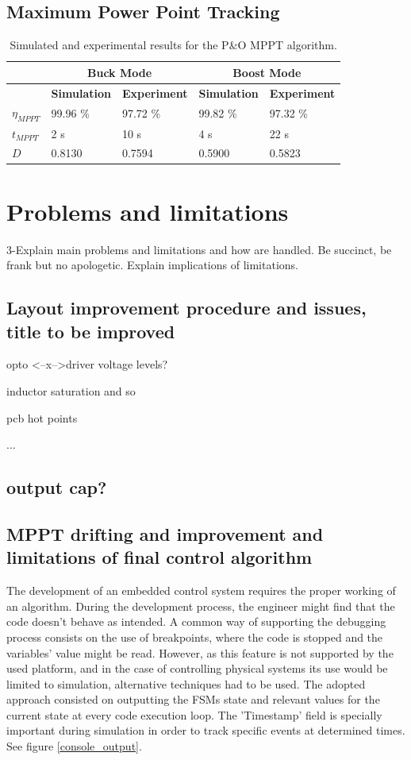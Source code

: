 \subsection{Maximum Power Point Tracking}

\begin{table}[H]
	\centering
	\begin{tabular}{|>{\centering}p{2.3cm}|p{2.3cm}|p{2.3cm}|p{2.3cm}|p{2.3cm}|}
		\hline
		 \rowcolor{lightgray} & \multicolumn{2}{|c|}{ \textbf{Buck Mode}} & \multicolumn{2}{|c|}{ \textbf{Boost Mode}} \tabularnewline \hline
		\rowcolor{lightgray} \textbf{} & \textbf{Simulation}  & \textbf{Experiment} & \textbf{Simulation}  & \textbf{Experiment}  \tabularnewline \hline
		$\eta_{MPPT}$ & 99.96 \% & 97.72 \% & 99.82 \% & 97.32 \% \tabularnewline \hline
		$t_{MPPT}$ & 2 s & 10 s & 4 s & 22 s \tabularnewline \hline
		$D$  & 0.8130 & 0.7594 & 0.5900 & 0.5823 \tabularnewline \hline
	\end{tabular}
	\caption{Simulated and experimental results for the P\&O MPPT algorithm.}
	\label{tab:comparisonMPPT}
\end{table}

\section{Problems and limitations}
3-Explain main problems and limitations and how are handled. Be succinct, be frank but no apologetic. Explain implications of limitations.
\subsection{Layout improvement procedure and issues, title to be improved}
opto <--x-->driver voltage levels?

inductor saturation and so

pcb hot points

...
\subsection{output cap?}
\subsection{MPPT drifting and improvement and limitations of final control algorithm}
The development of an embedded control system requires the proper working of an algorithm. During the development process, the engineer might find that the code doesn't behave as intended. A common way of supporting the debugging process consists on the use of breakpoints, where the code is stopped and the variables' value might be read. However, as this feature is not supported by the used platform, and in the case of controlling physical systems its use would be limited to simulation, alternative techniques had to be used. The adopted approach consisted on outputting the FSMs state and relevant values for the current state at every code execution loop. The 'Timestamp' field is specially important during simulation in order to track specific events at determined times. See figure \ref{console_output}.

